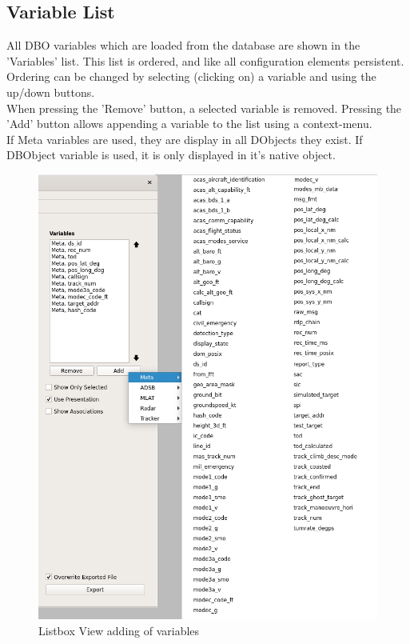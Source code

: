 \subsection{Variable List}
All DBO variables which are loaded from the database are shown in the 'Variables' list. This list is ordered, and like all configuration elements persistent. Ordering can be changed by selecting (clicking on) a variable and using the up/down buttons. \\

When pressing the 'Remove' button, a selected variable is removed.  Pressing the 'Add' button allows appending a variable to the list using a context-menu. \\

If Meta variables are used, they are display in all DObjects they exist. If DBObject variable is used, it is only displayed in it's native object.

\begin{figure}[H]
    \includegraphics[width=16cm,frame]{../screenshots/listbox_add.png}
  \caption{Listbox View adding of variables}
  \label{fig:listbox_load}
\end{figure}


